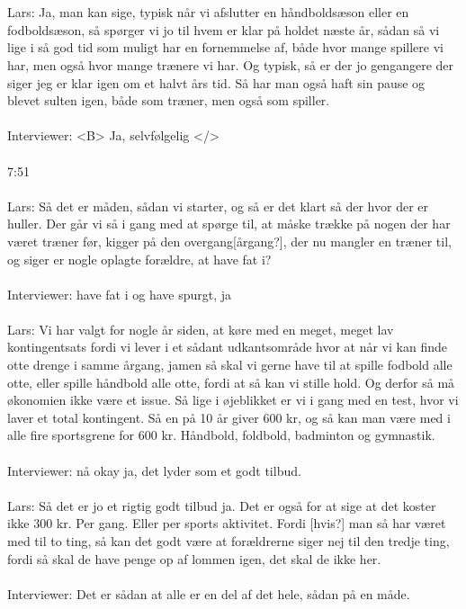 \\\\
Lars: Ja, man kan sige, typisk når vi afslutter en håndboldsæson eller en fodboldsæson, så spørger vi jo til hvem er klar på holdet næste år, sådan så vi lige i så god tid som muligt har en fornemmelse af, både hvor mange spillere vi har, men også hvor mange trænere vi har. Og typisk, så er der jo gengangere der siger jeg er klar igen om et halvt års tid. Så har man også haft sin pause og blevet sulten igen, både som træner, men også som spiller.
\\\\
Interviewer: <B> Ja, selvfølgelig </>
\\\\
7:51
\\\\
Lars: Så det er måden, sådan vi starter, og så er det klart så der hvor der er huller. Der går vi så i gang med at spørge til, at måske  trække på nogen der har været træner før, kigger på den overgang[årgang?], der nu mangler en træner til, og siger er nogle oplagte forældre, at have fat i?
\\\\
Interviewer: have fat i og have spurgt, ja
\\\\
Lars: Vi har valgt for nogle år siden, at køre med en meget, meget lav kontingentsats fordi vi lever i et sådant udkantsområde hvor at når vi kan finde otte drenge i samme årgang, jamen så skal vi gerne have til at spille fodbold alle otte, eller spille håndbold alle otte, fordi at så kan vi stille hold. Og derfor så må økonomien ikke være et issue.
Så lige i øjeblikket er vi i gang med en test, hvor vi laver et total kontingent. Så en på 10 år giver 600 kr, og så kan man være med i alle fire sportsgrene for 600 kr. Håndbold, foldbold, badminton og gymnastik. 
\\\\
Interviewer: nå okay ja, det lyder som et godt tilbud.
\\\\
Lars:  Så det er jo et rigtig godt tilbud ja. Det er også for at sige at det koster ikke 300 kr. Per gang. Eller per sports aktivitet. Fordi [hvis?] man så har været med til to ting, så kan det godt være at forældrerne siger nej til den tredje ting, fordi så skal de have penge op af lommen igen, det skal de ikke her. 
\\\\
Interviewer:  Det er sådan at alle er en del af det hele, sådan på en måde. 
